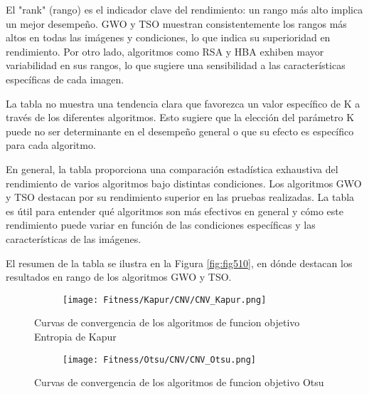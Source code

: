 \documentclass[conference]{IEEEtran}
\begin{document}
\noindent El "rank" (rango) es el indicador clave del rendimiento: un rango más alto implica un mejor desempeño. GWO y TSO muestran consistentemente los rangos más altos en todas las imágenes y condiciones, lo que indica su superioridad en rendimiento. Por otro lado, algoritmos como RSA y HBA exhiben mayor variabilidad en sus rangos, lo que sugiere una sensibilidad a las características específicas de cada imagen.

\noindent La tabla no muestra una tendencia clara que favorezca un valor específico de K a través de los diferentes algoritmos. Esto sugiere que la elección del parámetro K puede no ser determinante en el desempeño general o que su efecto es específico para cada algoritmo.

\noindent En general, la tabla proporciona una comparación estadística exhaustiva del rendimiento de varios algoritmos bajo distintas condiciones. Los algoritmos GWO y TSO destacan por su rendimiento superior en las pruebas realizadas. La tabla es útil para entender qué algoritmos son más efectivos en general y cómo este rendimiento puede variar en función de las condiciones específicas y las características de las imágenes.

\noindent El resumen de la tabla se ilustra en la Figura \ref{fig:fig510}, en dónde destacan los resultados en rango de los algoritmos GWO y TSO.



\begin{figure}
	\centering
	\begin{subfigure}{0.5\textwidth}
		\texttt{[image: Fitness/Kapur/CNV/CNV\_Kapur.png]}
	\end{subfigure}
	\caption{Curvas de convergencia de los algoritmos de funcion objetivo Entropia de Kapur}
	\label{fig:imagenes}    
\end{figure}


\begin{figure}
	\centering
	\begin{subfigure}{0.5\textwidth}
		\texttt{[image: Fitness/Otsu/CNV/CNV\_Otsu.png]}
	\end{subfigure}
	\caption{Curvas de convergencia de los algoritmos de funcion objetivo Otsu}
	\label{fig:imagenes}    
\end{figure}
\end{document}
